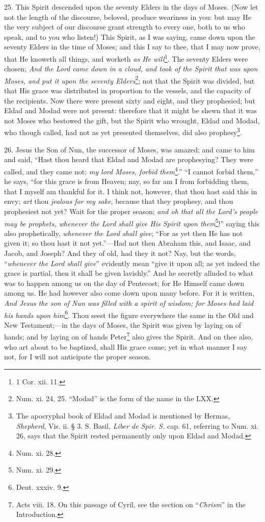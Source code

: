 25. This Spirit descended upon the seventy Elders in the days of Moses. (Now let not the length of the discourse, beloved, produce weariness in you: but may He the very subject of our discourse grant strength to every one, both to us who speak, and to you who listen!) This Spirit, as I was saying, came down upon the seventy Elders in the time of Moses; and this I say to thee, that I may now prove, that He knoweth all things, and worketh \emph{as He will}\footnote{1 Cor. xii. 11.}. The seventy Elders were chosen; \emph{And the Lord came down in a cloud, and took of the Spirit that was upon Moses, and put it upon the seventy Elders}\footnote{Num. xi. 24, 25. “Modad” is the form of the name in the \textsc{LXX.}}; not that the Spirit was divided, but that His grace was distributed in proportion to the vessels, and the capacity of the recipients. Now there were present sixty and eight, and they prophesied; but Eldad and Modad were not present: therefore that it might be shewn that it was not Moses who bestowed the gift, but the Spirit who wrought, Eldad and Modad, who though called, had not as yet presented themselves, did also prophesy\footnote{The apocryphal book of Eldad and Modad is mentioned by Hermas, \emph{Shepherd}, Vis. ii. § 3. S. Basil, \emph{Liber de Spir. S.} cap. 61, referring to Num. xi. 26, says that the Spirit rested permanently only upon Eldad and Modad.}.

26. Jesus the Son of Nun, the successor of Moses, was amazed; and came to him and said, “Hast thou heard that Eldad and Modad are prophesying? They were called, and they came not; \emph{my lord Moses, forbid them}\footnote{Num. xi. 28.}.” “I cannot forbid them,” he says, “for this grace is from Heaven; nay, so far am I from forbidding them, that I myself am thankful for it. I think not, however, that thou hast said this in envy; \emph{art} thou \emph{jealous for my sake}, because that they prophesy, and thou prophesiest not yet? Wait for the proper season; \emph{and oh that all the Lord’s people may be prophets, whenever the Lord shall give His Spirit upon them}\footnote{Num. xi. 29.}!” saying this also prophetically, \emph{whenever the Lord shall give}; “For as yet then He has not given it; so thou hast it not yet.”—Had not then Abraham this, and Isaac, and Jacob, and Joseph? And they of old, had they it not? Nay, but the words, “\emph{whenever the Lord shall give}” evidently mean “give it upon all; as yet indeed the grace is partial, then it shall be given lavishly.” And he secretly alluded to what was to happen among us on the day of Pentecost; for He Himself came down among us. He had however also come down upon many before. For it is written, \emph{And Jesus the son of Nun was filled with a spirit of wisdom; for Moses had laid his hands upon him}\footnote{Deut. xxxiv. 9.}. Thou seest the figure everywhere the same in the Old and New Testament;—in the days of Moses, the Spirit was given by laying on of hands; and by laying on of hands Peter\footnote{Acts viii. 18. On this passage of Cyril, see the section on “\emph{Chrism}” in the Introduction.} also gives the Spirit. And on thee also, who art about to be baptized, shall His grace come; yet in what manner I say not, for I will not anticipate the proper season.

